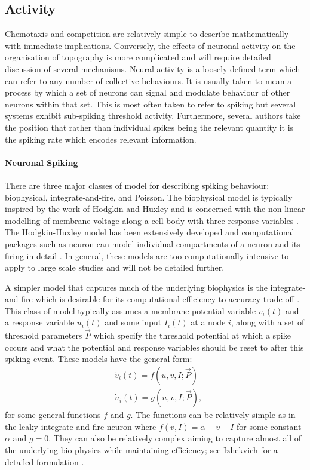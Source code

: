 \subsection{Activity \label{sec:activity}}
Chemotaxis and competition are relatively simple to describe mathematically with immediate implications. Conversely, the effects of neuronal activity on the organisation of topography is more complicated and will require detailed discussion of several mechanisms.  Neural activity is a loosely defined term which can refer to any number of collective behaviours. It is usually taken to mean a process by which a set of neurons can signal and modulate behaviour of other neurons within that set. This is most often taken to refer to spiking but several systems exhibit sub-spiking threshold activity. Furthermore, several authors take the position that rather than individual spikes being the relevant quantity it is the spiking rate which encodes relevant information.
\paragraph{Neuronal Spiking}
There are three major classes of model for describing spiking behaviour: biophysical, integrate-and-fire, and Poisson. The biophysical model is typically inspired by the work of Hodgkin and Huxley and is concerned with the non-linear modelling of membrane voltage along a cell body with three response variables \cite{Hodgkin1952-yi}. The Hodgkin-Huxley model has been extensively developed and computational packages such as neuron can model individual compartments of a neuron and its firing in detail \cite{Carnevale2006-gn}. In general, these models are too computationally intensive to apply to large scale studies and will not be detailed further.

A simpler model that captures much of the underlying biophysics is the integrate-and-fire which is desirable for its computational-efficiency to accuracy trade-off \cite{Abbott1999-ms, Burkitt2006-ne}. This class of model typically assumes a membrane potential variable $v_i(t)$ and a response variable $u_i(t)$ and some input $I_i(t)$ at a node $i$, along with a set of threshold parameters $\vec{P}$ which specify the threshold potential at which a spike occurs and what the potential and response variables should be reset to after this spiking event. These models have the general form:
\begin{align}
&\dot{v}_i(t) = f(u, v, I; \vec{P})\\
&\dot{u}_i(t) = g(u, v, I; \vec{P}),
\end{align}
for some general functions $f$ and $g$. The functions can be relatively simple as in the leaky integrate-and-fire neuron where $f(v, I) = \alpha - v + I$ for some constant $\alpha$ and $g = 0$. They can also be relatively complex aiming to capture almost all of the underlying bio-physics while maintaining efficiency; see Izhekvich for a detailed formulation \cite{Izhikevich2003-ht}. 

